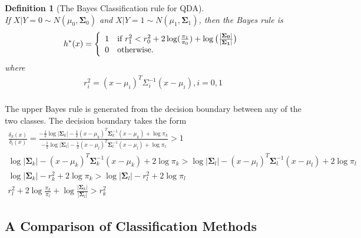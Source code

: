 \documentclass[12pt,a4paper]{article}%
\newtheorem{definition}{Definition}
\theoremstyle{definition}
\theoremstyle{plain}
\numberwithin{equation}{section}
\begin{document}
\begin{framed}
\begin{definition}[The Bayes Classification rule for QDA]
~\\
If $X|Y=0 \sim N(\mu_{0}, \boldsymbol{\Sigma}_{0})$ and $X|Y=1 \sim N(\mu_{1}, \boldsymbol{\Sigma}_{1})$, then the Bayes rule is 
\begin{gather*}
h^{*}(x) = \left\{
  \begin{array}{ll}
    1 & \mbox{\rm if } r^{2}_{1} < r^{2}_{0} + 2 \log(\frac{\pi_{1}}{\pi_{0}}) + \log \big( \frac{|\boldsymbol{\Sigma_{0}}|}{|\boldsymbol{\Sigma_{1}}|} \big) \\
    0 & \mbox{\rm otherwise.} \\
   \end{array} \right.
\end{gather*}
where
\begin{gather*}
r^{2}_{i} = (x-\mu_{i})^{T}\Sigma_{i}^{-1}(x-\mu_{i}), i=0,1 \\
\end{gather*}
\end{definition}
\end{framed}

The upper Bayes rule is generated from the decision boundary between any of the two classes.
The decision boundary takes the form 
\begin{gather*}
\frac{\delta_{k}(x)}{\delta_{l}(x)} = \frac{-\frac{1}{2}\log |\boldsymbol{\Sigma}_{k}| - \frac{1}{2}(x-\mu_{k})^{T} \boldsymbol{\Sigma}_{k}^{-1} (x-\mu_{k}) + \log \pi_{k}}{-\frac{1}{2}\log |\boldsymbol{\Sigma}_{l}| - \frac{1}{2}(x-\mu_{l})^{T} \boldsymbol{\Sigma}_{l}^{-1} (x-\mu_{l}) + \log \pi_{l}} > 1 \\
\log |\boldsymbol{\Sigma}_{k}| - (x-\mu_{k})^{T} \boldsymbol{\Sigma}_{k}^{-1} (x-\mu_{k}) + 2 \log \pi_{k} > \log |\boldsymbol{\Sigma}_{l}| - (x-\mu_{l})^{T} \boldsymbol{\Sigma}_{l}^{-1} (x-\mu_{l}) + 2 \log \pi_{l} \\
\log |\boldsymbol{\Sigma}_{k}| - r_{k}^{2} + 2 \log \pi_{k} > \log |\boldsymbol{\Sigma}_{l}| - r_{l}^{2} + 2 \log \pi_{l} \\
r_{l}^{2} + 2 \log \frac{\pi_{k}}{\pi_{l}} + \log \frac{|\boldsymbol{\Sigma}_{k}|}{|\boldsymbol{\Sigma}_{l}|} > r_{k}^{2}
\end{gather*}

\subsection{\textbf{A Comparison of Classification Methods}}
\end{document}
